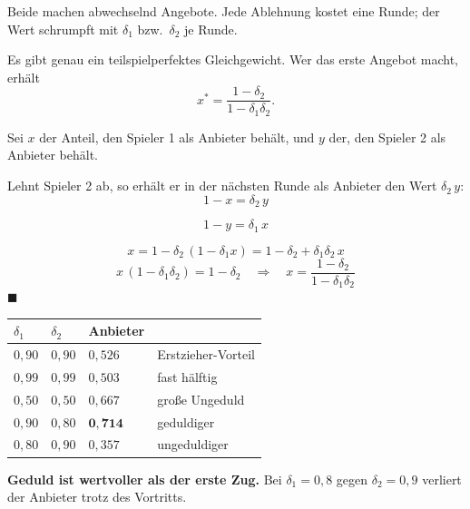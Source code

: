 \begin{merksatz}
Beide machen abwechselnd Angebote. Jede Ablehnung kostet eine Runde; der Wert schrumpft mit $\delta_1$ bzw.\ $\delta_2$ je Runde.

Es gibt genau ein teilspielperfektes Gleichgewicht. Wer das erste Angebot macht, erhält
\[ x^{*} = \frac{1-\delta_2}{1-\delta_1\delta_2} . \]

Sei $x$ der Anteil, den Spieler 1 als Anbieter behält, und $y$ der, den Spieler 2 als Anbieter behält.

 Lehnt Spieler 2 ab, so erhält er in der nächsten Runde als Anbieter den Wert $\delta_2\,y$:
\[ 1 - x = \delta_2\,y \]

\[ 1 - y = \delta_1\,x \]

\[ x = 1 - \delta_2\,(1-\delta_1 x) = 1-\delta_2+\delta_1\delta_2\,x \]
\[ x\,(1-\delta_1\delta_2) = 1-\delta_2 \quad\Longrightarrow\quad x = \frac{1-\delta_2}{1-\delta_1\delta_2} \]
$\blacksquare$

\begin{center}
{\small
\renewcommand{\arraystretch}{1.48}
\begin{tabular}{@{}P{1.6cm}P{1.6cm}P{2.0cm}P{2.4cm}@{}}
\toprule
$\delta_1$ & $\delta_2$ & \textbf{Anbieter} & \\
\midrule
$0{,}90$ & $0{,}90$ & $0{,}526$ & Erstzieher-Vorteil\\
$0{,}99$ & $0{,}99$ & $0{,}503$ & fast hälftig\\
$0{,}50$ & $0{,}50$ & $0{,}667$ & große Ungeduld\\
$0{,}90$ & $0{,}80$ & $\mathbf{0{,}714}$ & \textcolor{gruen}{geduldiger}\\
$0{,}80$ & $0{,}90$ & $0{,}357$ & \textcolor{akzent}{ungeduldiger}\\
\bottomrule
\end{tabular}}
\end{center}

\begin{center}
\begin{minipage}{0.9\textwidth}
\textbf{Geduld ist wertvoller als der erste Zug.} Bei $\delta_1 = 0{,}8$ gegen $\delta_2 = 0{,}9$ verliert der Anbieter trotz des Vortritts.
\end{minipage}
\end{center}


\end{merksatz}
